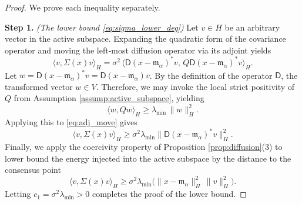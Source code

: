 \documentclass[12pt]{amsart}
\numberwithin{equation}{section}
\begin{document}
\begin{proof}
We prove each inequality separately. 

\textbf{Step 1.} \textit{(The lower bound \eqref{eq:sigma_lower_deg})} 
Let $v \in H$ be an arbitrary vector in the active subspace. Expanding the quadratic form of the covariance operator and moving the left-most diffusion operator via its adjoint yields
\begin{equation} \label{eq:adj_move}
    \langle v, \Sigma(x) v \rangle_H = \sigma^2 \,\langle \mathsf{D}(x - \mathfrak{m}_{\alpha})^* v, \, Q \mathsf{D}(x - \mathfrak{m}_{\alpha})^* v \rangle_H.
\end{equation}
Let $w = \mathsf{D}(x - \mathfrak{m}_{\alpha})^* v=\mathsf{D}(x - \mathfrak{m}_{\alpha}) v$. By the definition of the operator $ \mathsf{D}$,  the transformed vector $w \in V$. Therefore, we may invoke the local strict positivity of $Q$ from Assumption \ref{assump:active_subspace}, yielding 
\begin{equation*}
    \langle w, Q w \rangle_H \geq \lambda_{\min}\,\|w\|_H^2.
\end{equation*}
Applying this to \eqref{eq:adj_move} gives 
\begin{equation*}
    \langle v, \Sigma(x) v \rangle_H \geq \sigma^2 \lambda_{\min} \|\mathsf{D}(x - \mathfrak{m}_{\alpha})^* v\|_H^2.
\end{equation*}
Finally, we apply the coercivity property of Proposition \ref{prop:diffusion}(3) to lower bound the energy injected into the active subspace by the distance to the consensus point
\begin{equation*}
    \langle v, \Sigma(x) v \rangle_H \geq \sigma^2 \lambda_{\min} \Big( \|x - \mathfrak{m}_{\alpha}\|_H^2 \, \|v\|_H^2 \Big).
\end{equation*}
Letting $c_1 = \sigma^2 \lambda_{\min}>0 $ completes the proof of the lower bound.



\end{proof}
\end{document}
